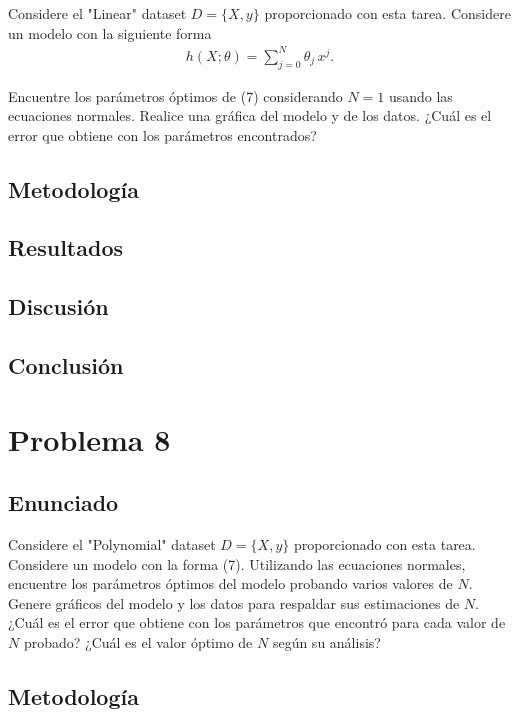 \documentclass{article}
\begin{document}
Considere el "Linear" dataset $D=\{X, y\}$ proporcionado con esta tarea. Considere un modelo con la siguiente forma
\begin{align} \tag{7}
h(X;\theta) = \sum_{j=0}^{N} \theta_j\, x^j.
\end{align}

Encuentre los parámetros óptimos de (7) considerando $N=1$ usando las ecuaciones normales. Realice una gráfica del modelo y de los datos. ¿Cuál es el error que obtiene con los parámetros encontrados?

\subsection{Metodología}

\subsection{Resultados}
\setcounter{equation}{0}

\subsection{Discusión}

\subsection{Conclusión}

\section{Problema 8}

\subsection{Enunciado}

Considere el "Polynomial" dataset $D = \{X,y\}$ proporcionado con esta tarea. Considere un modelo con la forma (7). Utilizando las ecuaciones normales, encuentre los parámetros óptimos del modelo probando varios valores de $N$. Genere gráficos del modelo y los datos para respaldar sus estimaciones de $N$. ¿Cuál es el error que obtiene con los parámetros que encontró para cada valor de $N$ probado? ¿Cuál es el valor óptimo de $N$ según su análisis?

\subsection{Metodología}
\end{document}
